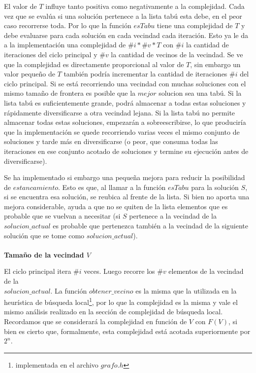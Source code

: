 \par{El valor de $T$ influye tanto positiva como negativamente a la complejidad.
Cada vez que se evalúa si una solución pertenece a la lista tabú esta debe, en
el peor caso recorrerse toda. Por lo que la función $esTabu$ tiene una
complejidad de $T$ y debe evaluarse para cada solución en cada vecindad cada
iteración. Esto ya le da a la implementación una complejidad de $\#i*\#v*T$ con
$\#i$ la cantidad de iteraciones del ciclo principal y $\#v$ la cantidad de
vecinos de la vecindad. Se ve que la complejidad es directamente proporcional
al valor de $T$, sin embargo un valor pequeño de $T$ también podría incrementar
la cantidad de iteraciones $\#i$ del ciclo principal. Si se está recorriendo
una vecindad con muchas soluciones con el mismo tamaño de frontera es posible
que la $mejor$ solucion sea una tabú. Si la lista tabú es suficientemente
grande, podrá almacenar a todas estas soluciones y rápidamente diversificarse
a otra vecindad lejana. Si la lista tabú no permite almacenar todas estas
soluciones, empezarán a sobreescribirse, lo que produciría que la
implementación se quede recorriendo varias veces el mismo conjunto de
soluciones y tarde más en diversificarse (o peor, que consuma todas las
iteraciones en ese conjunto acotado de soluciones y termine su ejecución
antes de diversificarse).}\\

\par{Se ha implementado si embargo una pequeña mejora para reducir la
posibilidad de $estancamiento$. Esto es que, al llamar a la función $esTabu$
para la solución $S$, si se encuentra esa solución, se reubica al frente de
la lista. Si bien no aporta una mejora considerable, ayuda a que no se quiten
de la lista elementos que es probable que se vuelvan a necesitar (si $S$
pertenece a la vecindad de la $solucion\_actual$ es probable que pertenezca
también a la vecindad de la siguiente solución que se tome como
$solucion\_actual$).}
\\\\
\textbf{Tamaño de la vecindad $V$}\\

\par{El ciclo principal itera $\#i$ veces. Luego recorre los $\#v$ elementos de
la vecindad de la\\$solucion\_actual$. La función $obtener\_vecino$ es la misma
que la utilizada en la heurística de búsqueda local\footnote{implementada en el
archivo $grafo.h$}, por lo que la complejidad es la misma y vale el mismo
análisis realizado en la sección de complejidad de búsqueda local. Recordamos
que se considerará la complejidad en función de $V$ con $F(V)$,
si bien es cierto que, formalmente, esta complejidad está acotada superiormente
por $2^n$.}\\
 
